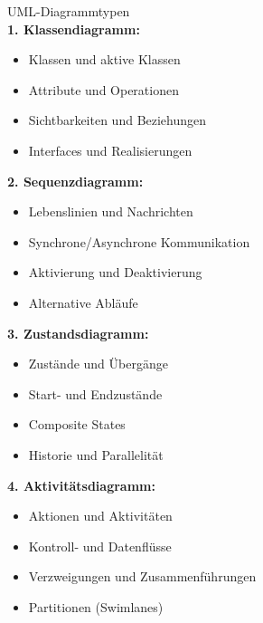 \begin{definition}{UML-Diagrammtypen}\\
\textbf{1. Klassendiagramm:}
\begin{itemize}
    \item Klassen und aktive Klassen
    \item Attribute und Operationen
    \item Sichtbarkeiten und Beziehungen
    \item Interfaces und Realisierungen
\end{itemize}

\textbf{2. Sequenzdiagramm:}
\begin{itemize}
    \item Lebenslinien und Nachrichten
    \item Synchrone/Asynchrone Kommunikation
    \item Aktivierung und Deaktivierung
    \item Alternative Abläufe
\end{itemize}

\textbf{3. Zustandsdiagramm:}
\begin{itemize}
    \item Zustände und Übergänge
    \item Start- und Endzustände
    \item Composite States
    \item Historie und Parallelität
\end{itemize}

\textbf{4. Aktivitätsdiagramm:}
\begin{itemize}
    \item Aktionen und Aktivitäten
    \item Kontroll- und Datenflüsse
    \item Verzweigungen und Zusammenführungen
    \item Partitionen (Swimlanes)
\end{itemize}
\end{definition}

